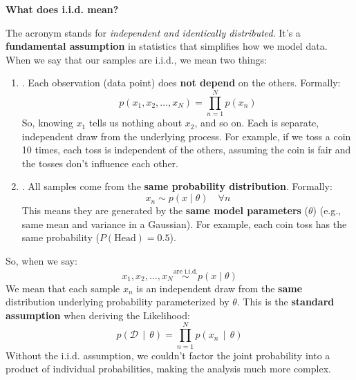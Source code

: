 \highspace
\begin{flushleft}
    \textcolor{Green3}{ \textbf{What does i.i.d. mean?}}
\end{flushleft}
The acronym  stands for \emph{independent and identically distributed}. It's a \textbf{fundamental assumption} in statistics that simplifies how we model data. When we say that our samples are i.i.d., we mean two things:
\begin{enumerate}
    \item {}. Each observation (data point) does \textbf{not depend} on the others. Formally:
    \begin{equation*}
        p\left(x_{1}, x_{2}, \dots, x_{N}\right) = \displaystyle\prod_{n=1}^{N} p\left(x_{n}\right)
    \end{equation*}
    So, knowing $x_{1}$ tells us nothing about $x_{2}$, and so on. Each is separate, independent draw from the underlying process. For example, if we toss a coin 10 times, each toss is independent of the others, assuming the coin is fair and the tosses don't influence each other.

    \item {}. All samples come from the \textbf{same probability distribution}. Formally:
    \begin{equation*}
        x_{n} \sim p\left(x \mid \theta\right) \quad \forall n
    \end{equation*}
    This means they are generated by the \textbf{same model parameters} ($\theta$) (e.g., same mean and variance in a Gaussian). For example, each coin toss has the same probability ($P(\text{Head}) = 0.5$).
\end{enumerate}
So, when we say:
\begin{equation*}
    x_{1}, x_{2}, \ldots, x_{N} \overset{\text{are i.i.d.}}{\sim} p\left(x \mid \theta\right)
\end{equation*}
We mean that each sample $x_{n}$ is an independent draw from the \textbf{same} distribution underlying probability parameterized by $\theta$. This is the \textbf{standard assumption} when deriving the Likelihood:
\begin{equation*}
    p\left(\mathcal{D} \, \mid \, \theta\right) = \displaystyle\prod_{n=1}^{N} p\left(x_{n} \, \mid \, \theta\right)
\end{equation*}
Without the i.i.d. assumption, we couldn't factor the joint probability into a product of individual probabilities, making the analysis much more complex.

